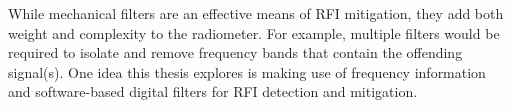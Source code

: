 While mechanical filters are an effective means of RFI mitigation, they add both weight and complexity to the radiometer.  For example, multiple filters would be required to isolate and remove frequency bands that contain the offending signal(s).  One idea this thesis explores is making use of frequency information and software-based digital filters for RFI detection and mitigation.



